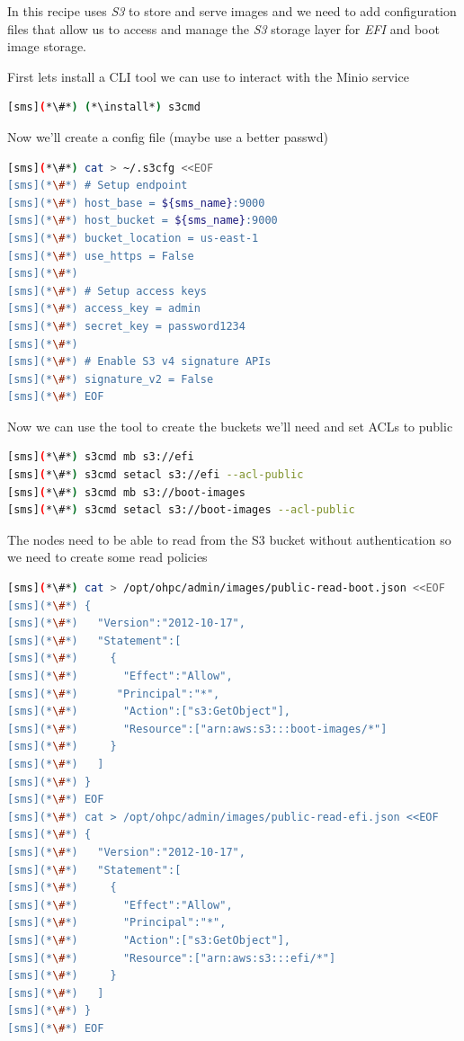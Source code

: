 In this recipe \OpenCHAMI{} uses {\em S3} to store and serve images and we need
to add configuration files that allow us to access and manage the {\em S3}
storage layer for {\em EFI} and boot image storage.


First lets install a CLI tool we can use to interact with the Minio service
\begin{lstlisting}[language=bash,keywords={}]
[sms](*\#*) (*\install*) s3cmd
\end{lstlisting}

Now we'll create a config file (maybe use a better passwd)
\begin{lstlisting}[language=bash,keywords={}]
[sms](*\#*) cat > ~/.s3cfg <<EOF
[sms](*\#*) # Setup endpoint
[sms](*\#*) host_base = ${sms_name}:9000
[sms](*\#*) host_bucket = ${sms_name}:9000
[sms](*\#*) bucket_location = us-east-1
[sms](*\#*) use_https = False
[sms](*\#*)
[sms](*\#*) # Setup access keys
[sms](*\#*) access_key = admin
[sms](*\#*) secret_key = password1234
[sms](*\#*)
[sms](*\#*) # Enable S3 v4 signature APIs
[sms](*\#*) signature_v2 = False
[sms](*\#*) EOF
\end{lstlisting}

Now we can use the tool to create the buckets we'll need and set ACLs to public
\begin{lstlisting}[language=bash,keywords={}]
[sms](*\#*) s3cmd mb s3://efi
[sms](*\#*) s3cmd setacl s3://efi --acl-public
[sms](*\#*) s3cmd mb s3://boot-images
[sms](*\#*) s3cmd setacl s3://boot-images --acl-public
\end{lstlisting}

The nodes need to be able to read from the S3 bucket without
authentication so we need to create some read policies
\begin{lstlisting}[language=bash,keywords={}]
[sms](*\#*) cat > /opt/ohpc/admin/images/public-read-boot.json <<EOF
[sms](*\#*) {
[sms](*\#*)   "Version":"2012-10-17",
[sms](*\#*)   "Statement":[
[sms](*\#*)     {
[sms](*\#*)       "Effect":"Allow",
[sms](*\#*)      "Principal":"*",
[sms](*\#*)       "Action":["s3:GetObject"],
[sms](*\#*)       "Resource":["arn:aws:s3:::boot-images/*"]
[sms](*\#*)     }
[sms](*\#*)   ]
[sms](*\#*) }
[sms](*\#*) EOF
[sms](*\#*) cat > /opt/ohpc/admin/images/public-read-efi.json <<EOF
[sms](*\#*) {
[sms](*\#*)   "Version":"2012-10-17",
[sms](*\#*)   "Statement":[
[sms](*\#*)     {
[sms](*\#*)       "Effect":"Allow",
[sms](*\#*)       "Principal":"*",
[sms](*\#*)       "Action":["s3:GetObject"],
[sms](*\#*)       "Resource":["arn:aws:s3:::efi/*"]
[sms](*\#*)     }
[sms](*\#*)   ]
[sms](*\#*) }
[sms](*\#*) EOF
\end{lstlisting}

